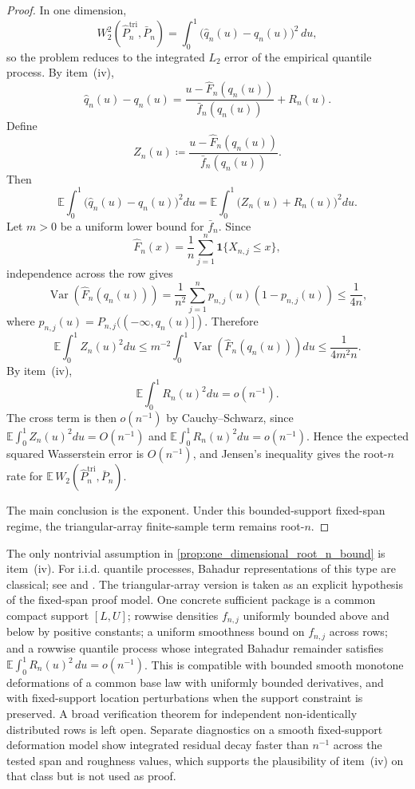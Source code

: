 \begin{proof}
In one dimension,
\[
  W_2^2\!\left(\widehat P_n^{\mathrm{tri}},\bar P_n\right)
  = \int_0^1 \bigl(\widehat q_n(u)-q_n(u)\bigr)^2\,du,
\]
so the problem reduces to the integrated $L_2$ error of the empirical quantile
process. By item~(iv),
\[
  \widehat q_n(u)-q_n(u)
  =
  \frac{u-\widehat F_n(q_n(u))}{\bar f_n(q_n(u))} + R_n(u).
\]
Define
\[
  Z_n(u)\coloneqq \frac{u-\widehat F_n(q_n(u))}{\bar f_n(q_n(u))}.
\]
Then
\[
  \mathbb E\int_0^1 \bigl(\widehat q_n(u)-q_n(u)\bigr)^2du
  =
  \mathbb E\int_0^1 \bigl(Z_n(u)+R_n(u)\bigr)^2du.
\]
Let $m>0$ be a uniform lower bound for $\bar f_n$. Since
\[
  \widehat F_n(x)=\frac1n\sum_{j=1}^n \mathbf 1\{X_{n,j}\le x\},
\]
independence across the row gives
\[
  \operatorname{Var}(\widehat F_n(q_n(u)))
  =
  \frac{1}{n^2}\sum_{j=1}^n p_{n,j}(u)(1-p_{n,j}(u))
  \le \frac{1}{4n},
\]
where $p_{n,j}(u)=P_{n,j}(({-}\infty,q_n(u)])$. Therefore
\[
  \mathbb E\int_0^1 Z_n(u)^2du
  \le
  m^{-2}\int_0^1 \operatorname{Var}(\widehat F_n(q_n(u)))du
  \le \frac{1}{4m^2 n}.
\]
By item~(iv),
\[
  \mathbb E\int_0^1 R_n(u)^2du=o(n^{-1}).
\]
The cross term is then $o(n^{-1})$ by Cauchy--Schwarz, since
\(
  \mathbb E\int_0^1 Z_n(u)^2du=O(n^{-1})
\)
and
\(
  \mathbb E\int_0^1 R_n(u)^2du=o(n^{-1})
\).
Hence the expected squared Wasserstein error is $O(n^{-1})$, and Jensen's
inequality gives the root-$n$ rate for
$\mathbb E\,W_2\!\left(\widehat P_n^{\mathrm{tri}},\bar P_n\right)$.

The main conclusion is the exponent. Under this bounded-support fixed-span
regime, the triangular-array finite-sample term remains root-$n$.
\end{proof}

\begin{remark}
The only nontrivial assumption in \cref{prop:one_dimensional_root_n_bound} is item~(iv). For
i.i.d. quantile processes, Bahadur representations of this type are classical;
see \citet{Bahadur1966} and \citet[Chapter~21]{vanDerVaart1998}. The
triangular-array version is taken as an explicit hypothesis of the fixed-span
proof model. One concrete sufficient package is a common compact support
$[L,U]$; rowwise densities $f_{n,j}$ uniformly bounded above and below by
positive constants; a uniform smoothness bound on $f_{n,j}$ across rows; and a
rowwise quantile process whose integrated Bahadur remainder satisfies
$\mathbb E\int_0^1 R_n(u)^2\,du=o(n^{-1})$. This is compatible with bounded smooth
monotone deformations of a common base law with uniformly bounded derivatives,
and with fixed-support location perturbations when the support constraint is
preserved. A broad verification theorem for independent non-identically
distributed rows is left open. Separate diagnostics on a smooth fixed-support
deformation model show integrated residual decay faster than $n^{-1}$ across the
tested span and roughness values, which supports the plausibility of item~(iv)
on that class but is not used as proof.
\end{remark}

